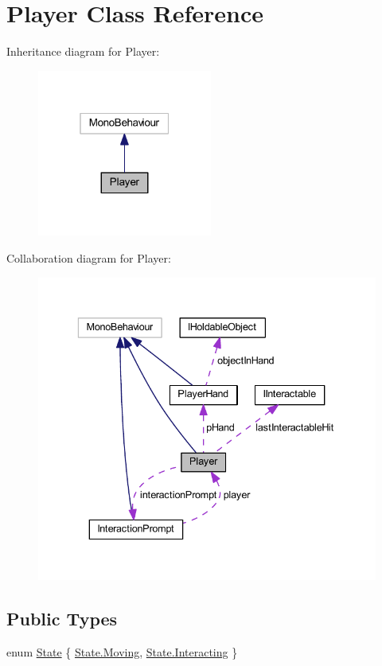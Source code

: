 \hypertarget{class_player}{}\section{Player Class Reference}
\label{class_player}


Inheritance diagram for Player\+:
\nopagebreak
\begin{figure}[H]
\begin{center}
\leavevmode
\includegraphics[width=163pt]{class_player__inherit__graph}
\end{center}
\end{figure}


Collaboration diagram for Player\+:
\nopagebreak
\begin{figure}[H]
\begin{center}
\leavevmode
\includegraphics[width=336pt]{class_player__coll__graph}
\end{center}
\end{figure}
\subsection*{Public Types}
\begin{DoxyCompactItemize}
\item 
enum \mbox{\hyperlink{class_player_aa3b6104791d642173caf761cf81f8c08}{State}} \{ \mbox{\hyperlink{class_player_aa3b6104791d642173caf761cf81f8c08adefe967ad0373b2274fc298f19125ca7}{State.\+Moving}}, 
\mbox{\hyperlink{class_player_aa3b6104791d642173caf761cf81f8c08af023446a52e84d38f186937dad1d8f76}{State.\+Interacting}}
 \}
\end{DoxyCompactItemize}
